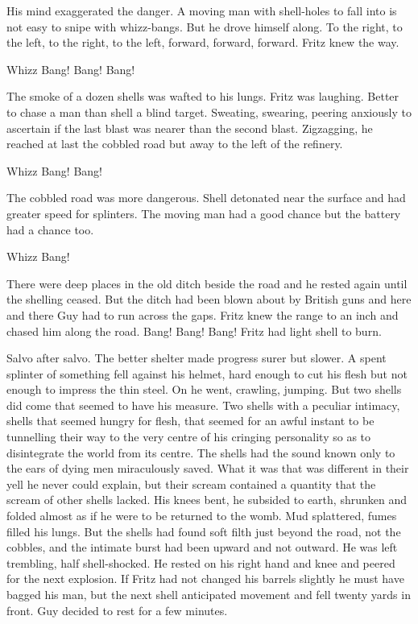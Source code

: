 His mind exaggerated the danger. A moving man with shell-holes to fall into is not easy to snipe with whizz-bangs. But he drove himself along. To the right, to the left, to the right, to the left, forward, forward, forward. Fritz knew the way.

Whizz Bang! Bang! Bang!

The smoke of a dozen shells was wafted to his lungs. Fritz was laughing. Better to chase a man than shell a blind target. Sweating, swearing, peering anxiously to ascertain if the last blast was nearer than the second blast. Zigzagging, he reached at last the cobbled road but away to the left of the refinery.

Whizz Bang! Bang!

The cobbled road was more dangerous. Shell detonated near the surface and had greater speed for splinters. The moving man had a good chance but the battery had a chance too.

Whizz Bang!

There were deep places in the old ditch beside the road and he rested again until the shelling ceased. But the ditch had been blown about by British guns and here and there Guy had to run across the gaps. Fritz knew the range to an inch and chased him along the road. Bang! Bang! Bang! Fritz had light shell to burn.

Salvo after salvo. The better shelter made progress surer but slower. A spent splinter of something fell against his helmet, hard enough to cut his flesh but not enough to impress the thin steel. On he went, crawling, jumping. But two shells did come that seemed to have his measure. Two shells with a peculiar intimacy, shells that seemed hungry for flesh, that seemed for an awful instant to be tunnelling their way to the very centre of his cringing personality so as to disintegrate the world from its centre. The shells had the sound known only to the ears of dying men miraculously saved. What it was that was different in their yell he never could explain, but their scream contained a quantity that the scream of other shells lacked. His knees bent, he subsided to earth, shrunken and folded almost as if he were to be returned to the womb. Mud splattered, fumes filled his lungs. But the shells had found soft filth just beyond the road, not the cobbles, and the intimate burst had been upward and not outward. He was left trembling, half shell-shocked. He rested on his right hand and knee and peered for the next explosion. If Fritz had not changed his barrels slightly he must have bagged his man, but the next shell anticipated movement and fell twenty yards in front. Guy decided to rest for a few minutes.

